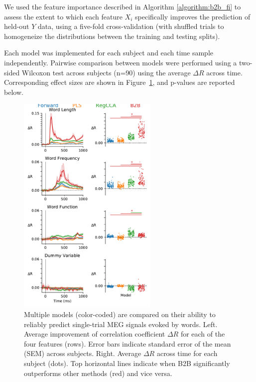 We used the feature importance described in Algorithm \ref{algorithm:b2b_fi} to
assess the extent to which each feature $X_i$ specifically improves the
prediction of held-out $Y$ data, using a five-fold cross-validation (with shuffled
trials to homogeneize the distributions between the training and testing
splits).

Each model was implemented for each subject and each time sample independently.
Pairwise comparison between models were performed using a two-sided Wilcoxon
test across subjects (n=90) using the average $\Delta R$ across time.
Corresponding effect sizes are shown in Figure~\ref{fig:meg_results}, and
p-values are reported below.

\begin{figure}
  \begin{center}
    \includegraphics[width=0.6\textwidth, trim=0cm 0cm 0cm 0cm, clip=True]{figures/meg.pdf}
  \end{center}
  \caption{Multiple models (color-coded) are compared on their ability to
  reliably predict single-trial MEG signals evoked by words. Left. Average
  improvement of correlation coefficient $\Delta R$ for each of the four
  features (rows). Error bars indicate standard error of the mean (SEM) across
  subjects. Right. Average $\Delta R$ across time for each subject (dots). Top
  horizontal lines indicate when B2B significantly outperforms other methods
  (red) and vice versa. \label{fig:meg_results}
}
\end{figure}


